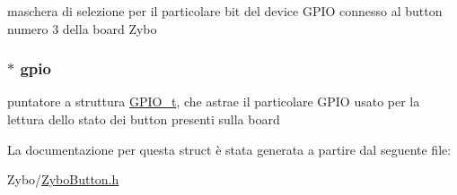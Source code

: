 maschera di selezione per il particolare bit del device G\+P\+I\+O connesso al button numero 3 della board Zybo \hypertarget{struct_zybo_button__t_acb3116190992a4d8d26545c103304d27}{
\subsubsection[{gpio}]{$\ast$ gpio}}\label{struct_zybo_button__t_acb3116190992a4d8d26545c103304d27}
puntatore a struttura \hyperlink{struct_g_p_i_o__t}{G\+P\+I\+O\+\_\+t}, che astrae il particolare G\+P\+I\+O usato per la lettura dello stato dei button presenti sulla board 

La documentazione per questa struct è stata generata a partire dal seguente file\+:\begin{DoxyCompactItemize}
\item 
Zybo/\hyperlink{_zybo_button_8h}{Zybo\+Button.\+h}\end{DoxyCompactItemize}
